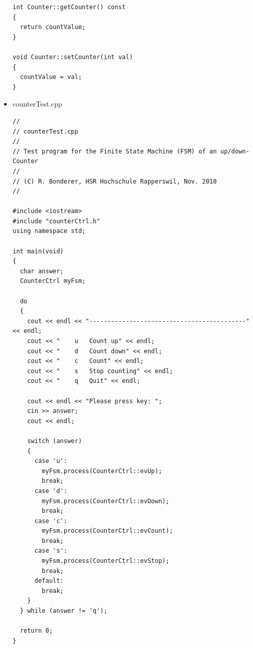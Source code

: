 \begin{itemize}
\begin{lstlisting}
int Counter::getCounter() const
{
  return countValue;
}

void Counter::setCounter(int val)
{
  countValue = val;
}

\end{lstlisting}
\item counterTest.cpp
\begin{lstlisting}
//
// counterTest.cpp
//
// Test program for the Finite State Machine (FSM) of an up/down-Counter
//
// (C) R. Bonderer, HSR Hochschule Rapperswil, Nov. 2010
//

#include <iostream>
#include "counterCtrl.h"
using namespace std;

int main(void)
{
  char answer;
  CounterCtrl myFsm;
  
  do
  {
    cout << endl << "-------------------------------------------" << endl;
    cout << "    u   Count up" << endl;
    cout << "    d   Count down" << endl;
    cout << "    c   Count" << endl;
    cout << "    s   Stop counting" << endl;
    cout << "    q   Quit" << endl;

    cout << endl << "Please press key: ";
    cin >> answer;
    cout << endl;
    
    switch (answer)
    {
      case 'u':
        myFsm.process(CounterCtrl::evUp);
        break;
      case 'd':
        myFsm.process(CounterCtrl::evDown);
        break;
      case 'c':
        myFsm.process(CounterCtrl::evCount);
        break;
      case 's':
        myFsm.process(CounterCtrl::evStop);
        break;
      default:
        break;
    }
  } while (answer != 'q');
  
  return 0;
}


\end{lstlisting}
\end{itemize}
